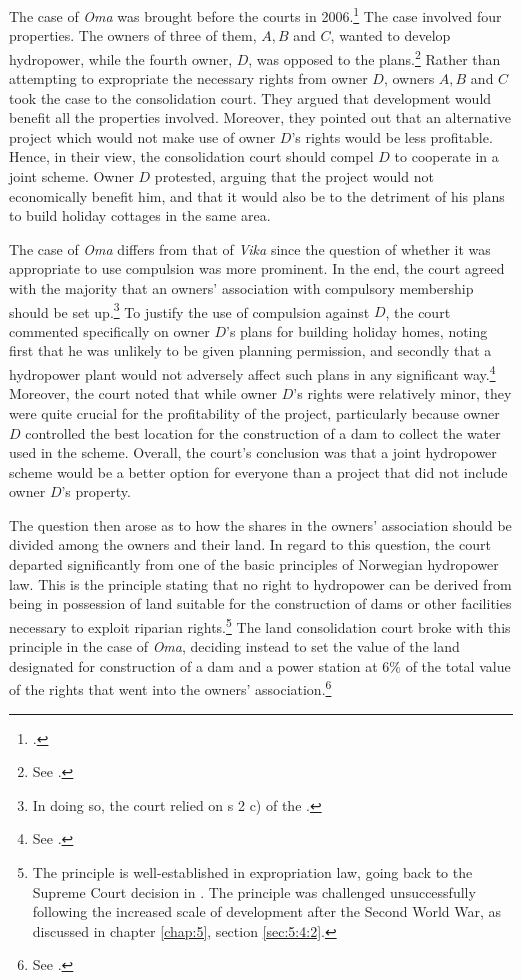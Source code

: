 The case of \emph{Oma} was brought before the courts in 2006.\footcite{oma06} The case involved four properties. The owners of three of them, $A,B$ and $C$, wanted to develop hydropower, while the fourth owner, $D$, was opposed to the plans.\footnote{See \cite[36-39]{stokstad11}.} Rather than attempting to expropriate the necessary rights from owner $D$, owners $A,B$ and $C$ took the case to the consolidation court. They argued that development would benefit all the properties involved. Moreover, they pointed out that an alternative project which would not make use of owner $D$'s rights would be less profitable. Hence, in their view, the consolidation court should compel $D$ to cooperate in a joint scheme. Owner $D$ protested, arguing that the project would not economically benefit him, and that it would also be to the detriment of his plans to build holiday cottages in the same area. 

The case of \emph{Oma} differs from that of \emph{Vika} since the question of whether it was appropriate to use compulsion was more prominent. In the end, the court agreed with the majority that an owners' association with compulsory membership should be set up.\footnote{In doing so, the court relied on s 2 c) of the \cite{lca79}.} To justify the use of compulsion against $D$, the court commented specifically on owner $D$'s plans for building holiday homes, noting first that he was unlikely to be given planning permission, and secondly that a hydropower plant would not adversely affect such plans in any significant way.\footnote{See \cite[36-37]{stokstad11}.} Moreover, the court noted that while owner $D$'s rights were relatively minor, they were quite crucial for the profitability of the project, particularly because owner $D$ controlled the best location for the construction of a dam to collect the water used in the scheme. Overall, the court's conclusion was that a joint hydropower scheme would be a better option for everyone than a project that did not include owner $D$'s property.

The question then arose as to how the shares in the owners' association should be divided among the owners and their land. In regard to this question, the court departed significantly from one of the basic principles of Norwegian hydropower law. This is the principle stating that no right to hydropower can be derived from being in possession of land suitable for the construction of dams or other facilities necessary to exploit riparian rights.\footnote{The principle is well-established in expropriation law, going back to the Supreme Court decision in \cite{herlandsfossen22}. The principle was challenged unsuccessfully following the increased scale of development after the Second World War, as discussed in chapter \ref{chap:5}, section \ref{sec:5:4:2}.} The land consolidation court broke with this principle in the case of \emph{Oma}, deciding instead to set the value of the land designated for construction of a dam and a power station at $6 \%$ of the total value of the rights that went into the owners' association.\footnote{See \cite[36]{stokstad11}.}

